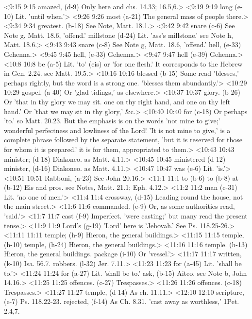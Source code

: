 <9:15 9:15  amazed, (d-9)  Only here and chs. 14.33; 16.5,6.>
<9:19 9:19  long (e-10)  Lit. 'until when.'>
<9:26 9:26  most (a-21)  The general mass of people there.>
<9:34 9:34  greatest. (b-18)  See Note, Matt. 18.1.>
<9:42 9:42  snare (c-6) See Note g, Matt. 18.6, 'offend.'
  millstone (d-24)  Lit. 'ass's millstone.' see Note h, Matt. 18.6.>
<9:43 9:43  snare (c-8)  See Note g, Matt. 18.6, 'offend.'
  hell, (e-33) Gehenna.>
<9:45 9:45  hell, (e-33) Gehenna.>
<9:47 9:47  hell (e-39)  Gehenna.>
<10:8 10:8  be (a-5)  Lit. 'to' (eis) or 'for one flesh.' It corresponds to the  Hebrew in Gen. 2.24. see Matt. 19.5.>
<10:16 10:16  blessed (b-15)  Some read 'blesses,' perhaps rightly, but the word is a  strong one. 'blesses them abundantly.'>
<10:29 10:29  gospel, (a-40)  Or 'glad tidings,' as elsewhere.>
<10:37 10:37  glory. (b-26)  Or 'that in thy glory we may sit. one on thy right hand, and  one on thy left hand.' Or 'that we may sit in thy glory,' &c.>
<10:40 10:40  for (c-18)  Or perhaps 'to.' so Matt. 20.23. But the emphasis is on the  words 'not mine to give;' wonderful perfectness and lowliness  of the Lord! 'It is not mine to give,' is a complete phrase  followed by the separate statement, 'but it is reserved for  those for whom it is prepared.' it is for them, appropriated to  them.>
<10:43 10:43  minister; (d-18) Diakoneo. as Matt. 4.11.>
<10:45 10:45  ministered (d-12)  minister, (d-16)
  Diakoneo. as Matt. 4.11.>
<10:47 10:47  was (e-6)  Lit. 'is.'>
<10:51 10:51  Rabboni, (a-23)  See John 20.16.>
<11:1 11:1  to (b-6)  to (b-8)  at (b-12)
  Eis and pros. see Notes, Matt. 21.1; Eph. 4.12.>
<11:2 11:2  man (c-31)  Lit. 'no one of men.'>
<11:4 11:4  crossway, (d-15)  Leading round the house, not the main street.>
<11:6 11:6  commanded. (e-9)  Or, as some authorities read, 'said.'>
<11:7 11:7  cast (f-9)  Imperfect. 'were casting;' but many read the present tense.>
<11:9 11:9  Lord's (g-19)  'Lord' here is 'Jehovah.' See Ps. 118.25-26.>
<11:11 11:11  temple; (h-9) Hieron, the general buildings.>
<11:15 11:15  temple, (h-10)  temple, (h-24)
 Hieron, the general buildings.>
<11:16 11:16  temple. (h-13)  Hieron, the general buildings.
  package (i-10)  Or 'vessel.'>
<11:17 11:17  written, (k-10)  Isa. 56.7.
  robbers. (l-32)  Jer. 7.11.>
<11:23 11:23  for (a-45) Lit. 'shall be to.'>
<11:24 11:24  for (a-27)  Lit. 'shall be to.'
  ask, (b-15)  Aiteo. see Note b, John 14.16.>
<11:25 11:25  offences. (c-27) Trespasses.>
<11:26 11:26  offences. (c-18)  Trespasses.>
<11:27 11:27  temple, (d-14)  As ch. 11.11.>
<12:10 12:10  scripture, (e-7)  Ps. 118.22-23.
  rejected, (f-14)  As Ch. 8.31. 'cast away as worthless,' 1Pet. 2.4,7.
